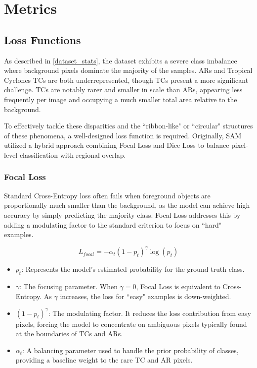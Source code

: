 \section{Metrics}
\subsection{Loss Functions}

As described in \autoref{dataset_stats}, the dataset exhibits a severe class imbalance where background pixels dominate the majority of the samples. ARs and Tropical Cyclones TCs are both underrepresented, though TCs present a more significant challenge. TCs are notably rarer and smaller in scale than ARs, appearing less frequently per image and occupying a much smaller total area relative to the background.

To effectively tackle these disparities and the ``ribbon-like" or ``circular" structures of these phenomena, a well-designed loss function is required. Originally, SAM utilized a hybrid approach combining Focal Loss and Dice Loss to balance pixel-level classification with regional overlap.

\subsubsection{Focal Loss}
Standard Cross-Entropy loss often fails when foreground objects are proportionally much smaller than the background, as the model can achieve high accuracy by simply predicting the majority class. Focal Loss addresses this by adding a modulating factor to the standard criterion to focus on ``hard" examples.

\begin{equation}
L_{focal} = -\alpha_t (1 - p_t)^\gamma \log(p_t)
\end{equation}

\begin{itemize}
    \item $p_t$: Represents the model's estimated probability for the ground truth class. 
    \item $\gamma$: The focusing parameter. When $\gamma = 0$, Focal Loss is equivalent to Cross-Entropy. As $\gamma$ increases, the loss for ``easy" examples is down-weighted.
    \item $(1 - p_t)^\gamma$: The modulating factor. It reduces the loss contribution from easy pixels, forcing the model to concentrate on ambiguous pixels typically found at the boundaries of TCs and ARs.
    \item $\alpha_t$: A balancing parameter used to handle the prior probability of classes, providing a baseline weight to the rare TC and AR pixels.
\end{itemize}

